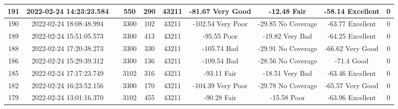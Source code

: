\begin{longtable*}{|c|c|c|c|c|c|c|c|c|c|}
191&2022-02-24 14:23:23.584&&550&290&43211& -81.67    Very Good   & -12.48    Fair        & -58.14    Excellent   & 0\\\hline
{}190&2022-02-24 18:08:48.994&&3300&102&43211& -102.54   Very Poor   & -29.85    No Coverage & -63.77    Excellent   & 0\\\hline
{}189&2022-02-24 15:51:05.573&&3300&413&43211& -95.55    Poor        & -19.82    Very Bad    & -64.25    Excellent   & 0\\\hline
{}188&2022-02-24 17:20:38.273&&3300&330&43211& -105.74   Bad         & -29.91    No Coverage & -66.62    Very Good   & 0\\\hline
{}186&2022-02-24 15:29:39.312&&3300&136&43211& -109.54   Bad         & -28.56    No Coverage & -71.4     Good        & 0\\\hline
{}185&2022-02-24 17:17:23.749&&3102&316&43211& -93.11    Fair        & -18.51    Very Bad    & -63.46    Excellent   & 0\\\hline
{}182&2022-02-24 16:23:52.156&&3300&170&43211& -104.39   Very Poor   & -29.78    No Coverage & -65.57    Very Good   & 0\\\hline
{}179&2022-02-24 13:01:16.370&&3102&455&43211& -90.28    Fair        & -15.58    Poor        & -63.96    Excellent   & 0\\\hline

\end{longtable*}
